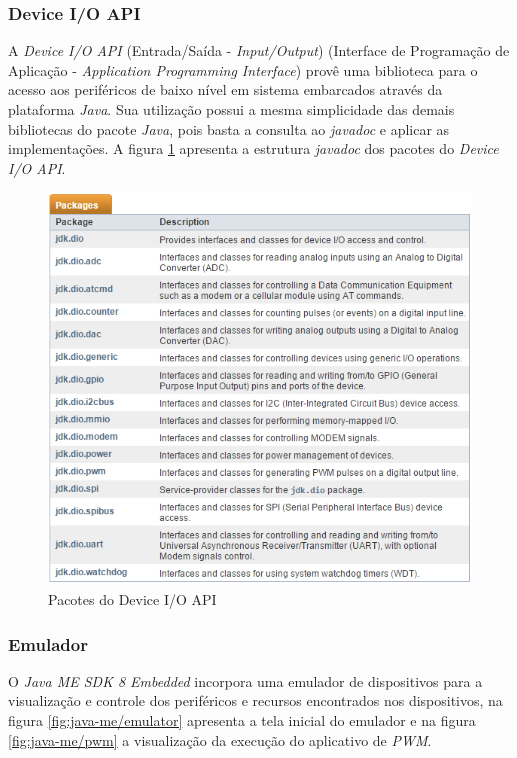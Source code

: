 \subsubsection{Device I/O API}

A \textit{Device I/O API} (Entrada/Saída - \textit{Input/Output}) (Interface de
Programação de Aplicação - \textit{Application Programming Interface}) provê
uma biblioteca para o acesso aos periféricos de baixo nível em sistema
embarcados através da plataforma \textit{Java}. Sua utilização possui a mesma
simplicidade das demais bibliotecas do pacote \textit{Java}, pois basta a
consulta ao \textit{javadoc} e aplicar as implementações. A figura
\ref{fig:java-me/java-me-javadoc-deviceioapi} apresenta a estrutura
\textit{javadoc} dos pacotes do \textit{Device I/O API}.

\begin{figure}[H]
    \centering
    \includegraphics[width=0.7\linewidth]{figuras/java/java-me-javadoc-deviceioapi.png}
    \caption{Pacotes do Device I/O API}
    \label{fig:java-me/java-me-javadoc-deviceioapi}
\end{figure}

\subsubsection{Emulador}

O \textit{Java ME SDK 8 Embedded} incorpora uma emulador de dispositivos para a
visualização e controle dos periféricos e recursos encontrados nos
dispositivos, na figura \ref{fig:java-me/emulator} apresenta a tela inicial do
emulador e na figura \ref{fig:java-me/pwm} a visualização da execução do
aplicativo de \textit{PWM}.

